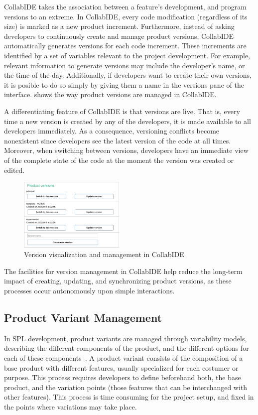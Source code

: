 CollabIDE takes the association between a feature's development, and program versions to an 
extreme. In CollabIDE, every code modification (regardless of its size) is marked as a new product 
increment. Furthermore, instead of asking developers to continuously create and manage product 
versions, CollabIDE automatically generates versions for each code increment. These increments are 
identified by a set of variables relevant to the project development. For example, relevant information 
to generate versions may include the developer's name, or the time of the day. Additionally, if 
developers want to create their own versions, it is posible to do so simply by giving them a name in 
the versions pane of the interface.  shows the way product versions are 
managed in CollabIDE. 

A differentiating feature of CollabIDE is that versions are live. That is, every time a new version is 
created by any of the developers, it is made available to all developers immediately. 
As a consequence, versioning conflicts become nonexistent since developers see the latest 
version of the code at all times. Moreover, when switching between versions, developers have an 
immediate view of the complete state of the code at the moment the version was created or edited. 

\begin{figure}[tbp]
  \centering
  \includegraphics[width=0.45\textwidth]{img/fig4-collabIDEVersionManagement}
  \caption{Version visualization and management in CollabIDE}
  \label{fig:versions}
\end{figure}

The facilities for version management in CollabIDE help reduce the long-term impact of creating, 
updating, and synchronizing product versions, as these processes occur autonomously upon simple 
interactions.

\subsection{Product Variant Management}
\label{sec:product-variant}
In \ac{SPL} development, product variants are managed through variability models, describing the 
different components of the product, and the different options for each of these 
components~\cite{pohl05}. A product variant consists of the composition of a base product with 
different features, usually specialized for each costumer or purpose. This process requires developers 
to define beforehand both, the base product, and the variation points (\ie those features that can be 
interchanged with other features). This process is time consuming for the project setup, and fixed in 
the points where variations may take place.


